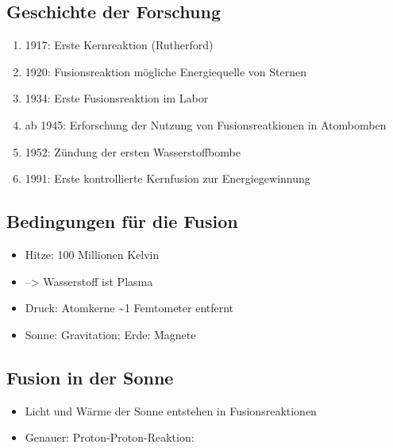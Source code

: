 \documentclass[10pt,a4paper, ngerman]{beamer}
\begin{document}
\subsection{Geschichte der Forschung}
\begin{frame}{\subsecname}{\secname}
\begin{enumerate}
\item 1917: Erste Kernreaktion (Rutherford)

\item 1920: Fusionsreaktion mögliche Energiequelle von Sternen

\item 1934: Erste Fusionsreaktion im Labor

\item ab 1945: Erforschung der Nutzung von Fusionsreatkionen in Atombomben

\item 1952: Zündung der ersten Wasserstoffbombe

\item 1991: Erste kontrollierte Kernfusion zur Energiegewinnung
\end{enumerate}
\end{frame}

\subsection{Bedingungen für die Fusion}
\begin{frame}{\subsecname}{\secname}
\begin{itemize}
\item Hitze: 100 Millionen Kelvin
\item --> Wasserstoff ist Plasma
\item Druck: Atomkerne \textasciitilde1 Femtometer entfernt
\item Sonne: Gravitation; Erde: Magnete
\end{itemize}
\end{frame}


\subsection{Fusion in der Sonne}
\begin{frame}{\subsecname}{\secname}
\begin{itemize}
\item Licht und Wärme der Sonne entstehen in Fusionsreaktionen \pause
\item Genauer: Proton-Proton-Reaktion:
\end{itemize}
\end{frame}
\end{document}

